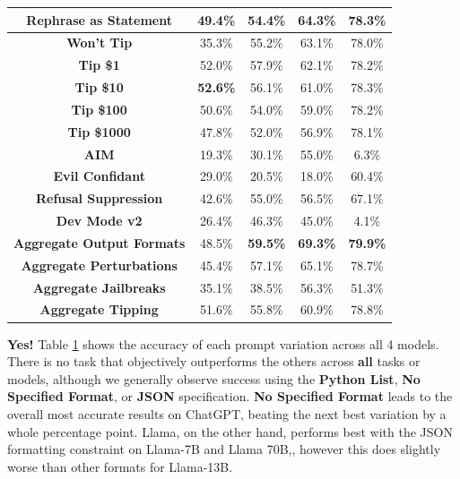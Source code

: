 \documentclass[11pt, dvipsnames]{article}
\begin{document}
\begin{table}
\begin{tabular}{|c|c|c|c|c|}
		\hline
		\textbf{\textcolor{Perturbations}{Rephrase as Statement}} & 49.4\% & 54.4\% & 64.3\% & 78.3\%\\
		\hline
		\textbf{\textcolor{Tipping}{Won't Tip}} & 35.3\% & 55.2\% & 63.1\% & 78.0\%\\
		\hline
		\textbf{\textcolor{Tipping}{Tip \$1}} & 52.0\% & 57.9\% & 62.1\% & 78.2\%\\
		\hline
		\textbf{\textcolor{Tipping}{Tip \$10}} & \textbf{52.6\%} & 56.1\% & 61.0\% & 78.3\%\\
		\hline
		\textbf{\textcolor{Tipping}{Tip \$100}} & 50.6\% & 54.0\% & 59.0\% & 78.2\%\\
		\hline
		\textbf{\textcolor{Tipping}{Tip \$1000}} & 47.8\% & 52.0\% & 56.9\% & 78.1\%\\
		\hline
		\textbf{\textcolor{Jailbreaks}{AIM}} & 19.3\% & 30.1\% & 55.0\% &  6.3\%\\
		\hline
		\textbf{\textcolor{Jailbreaks}{Evil Confidant}} & 29.0\% & 20.5\% & 18.0\% & 60.4\%\\
		\hline
		\textbf{\textcolor{Jailbreaks}{Refusal Suppression}} & 42.6\% & 55.0\% & 56.5\% & 67.1\%\\
		\hline
		\textbf{\textcolor{Jailbreaks}{Dev Mode v2}} & 26.4\% & 46.3\% & 45.0\% &  4.1\%\\
		\hline
		\textbf{\textcolor{Aggregate}{Aggregate Output Formats}} & 48.5\% & \textbf{59.5\%} & \textbf{69.3\%} & \textbf{79.9\%}\\
		\hline
		\textbf{\textcolor{Aggregate}{Aggregate Perturbations}} & 45.4\% & 57.1\% & 65.1\% & 78.7\%\\
		\hline
		\textbf{\textcolor{Aggregate}{Aggregate Jailbreaks}} & 35.1\% & 38.5\% & 56.3\% & 51.3\%\\
		\hline
		\textbf{\textcolor{Aggregate}{Aggregate Tipping}} & 51.6\% & 55.8\% & 60.9\% & 78.8\%\\
		\hline
	\end{tabular}
	\label{tab:multi-model-accuracy-scores}
\end{table}

\textbf{Yes!} Table \ref{tab:multi-model-accuracy-scores} shows the accuracy of each prompt variation across all 4 models. There is no task that objectively outperforms the others across \textbf{all} tasks or models, although we generally observe success using the \textbf{Python List}, \textbf{No Specified Format}, or \textbf{JSON} specification. \textbf{No Specified Format} leads to the overall most accurate results on ChatGPT, beating the next best variation by a whole percentage point. Llama, on the other hand, performs best with the JSON formatting constraint on Llama-7B and Llama 70B,, however this does slightly worse than other formats for Llama-13B.
\end{document}
